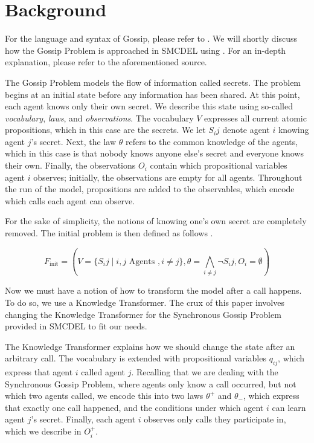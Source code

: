 \section{Background}\label{sec:Background}

For the language and syntax of Gossip, please refer to \cite{gattinger2023gomoche}. We will shortly discuss how the Gossip Problem is approached in SMCDEL using \cite{GattingerThesis2018}. For an in-depth explanation, please refer to the aforementioned source.

The Gossip Problem models the flow of information called secrets. The problem begins at an initial state before any information has been shared. At this point, each agent knows only their own secret. We describe this state using so-called \textit{vocabulary}, \textit{laws}, and \textit{observations}. The vocabulary $V$ expresses all current atomic propositions, which in this case are the secrets. We let $S_ij$ denote agent $i$ knowing agent $j$'s secret. Next, the law $\theta$ refers to the common knowledge of the agents, which in this case is that nobody knows anyone else's secret and everyone knows their own. Finally, the observations $O_i$ contain which propositional variables agent $i$ observes; initially, the observations are empty for all agents. Throughout the run of the model, propositions are added to the observables, which encode which calls each agent can observe.

For the sake of simplicity, the notions of knowing one's own secret are completely removed. The initial problem is then defined as follows \cite{GattingerThesis2018}.

$$F_\text{init} = (V = \{S_ij \mid i, j \text{ Agents }, i \neq j\}, \theta =\bigwedge_{i\neq j} \lnot S_ij , O_i = \emptyset)$$ 

Now we must have a notion of how to transform the model after a call happens. To do so, we use a Knowledge Transformer. The crux of this paper involves changing the Knowledge Transformer for the Synchronous Gossip Problem provided in SMCDEL to fit our needs. 

The Knowledge Transformer explains how we should change the state after an arbitrary call. The vocabulary is extended with propositional variables $q_{ij}$, which express that agent $i$ called agent $j$. Recalling that we are dealing with the Synchronous Gossip Problem, where agents only know a call occurred, but not which two agents called, we encode this into two laws $\theta^+$ and $\theta_-$, which express that exactly one call happened, and the conditions under which agent $i$ can learn agent $j$'s secret. Finally, each agent $i$ observes only calls they participate in, which we describe in $O^+_i$. 

